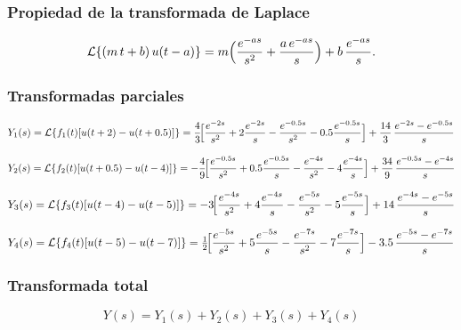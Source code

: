 \documentclass[11pt,letterpaper]{article}
\begin{document}
\subsubsection{Propiedad de la transformada de Laplace}

\begin{equation}
\mathcal{L}\{(m\,t + b)\,u(t - a)\}
= m\Bigl(\frac{e^{-a s}}{s^2} + \frac{a\,e^{-a s}}{s}\Bigr)
+ b\,\frac{e^{-a s}}{s}.
\label{eq:propiedad}
\end{equation}

\subsubsection{Transformadas parciales}

\begin{equation}
Y_1(s)=\mathcal{L}\{f_1(t)[u(t+2)-u(t+0.5)]\}
=\frac{4}{3}\!\Bigl[\frac{e^{-2s}}{s^2}+2\frac{e^{-2s}}{s}
                -\frac{e^{-0.5s}}{s^2}-0.5\frac{e^{-0.5s}}{s}\Bigr]
 +\frac{14}{3}\,\frac{e^{-2s}-e^{-0.5s}}{s}
\label{eq:Y1}
\end{equation}

\begin{equation}
Y_2(s)=\mathcal{L}\{f_2(t)[u(t+0.5)-u(t-4)]\}
=-\frac{4}{9}\!\Bigl[\frac{e^{-0.5s}}{s^2}+0.5\frac{e^{-0.5s}}{s}
                   -\frac{e^{-4s}}{s^2}-4\frac{e^{-4s}}{s}\Bigr]
 +\frac{34}{9}\,\frac{e^{-0.5s}-e^{-4s}}{s}
\label{eq:Y2}
\end{equation}

\begin{equation}
Y_3(s)=\mathcal{L}\{f_3(t)[u(t-4)-u(t-5)]\}
=-3\!\Bigl[\frac{e^{-4s}}{s^2}+4\frac{e^{-4s}}{s}
           -\frac{e^{-5s}}{s^2}-5\frac{e^{-5s}}{s}\Bigr]
 +14\,\frac{e^{-4s}-e^{-5s}}{s}
\label{eq:Y3}
\end{equation}

\begin{equation}
Y_4(s)=\mathcal{L}\{f_4(t)[u(t-5)-u(t-7)]\}
=\tfrac12\!\Bigl[\frac{e^{-5s}}{s^2}+5\frac{e^{-5s}}{s}
               -\frac{e^{-7s}}{s^2}-7\frac{e^{-7s}}{s}\Bigr]
 -3.5\,\frac{e^{-5s}-e^{-7s}}{s}
\label{eq:Y4}
\end{equation}

\subsubsection{Transformada total}

\begin{equation}
Y(s)=Y_1(s)+Y_2(s)+Y_3(s)+Y_4(s)
\label{eq:Ytotal}
\end{equation}
\end{document}
